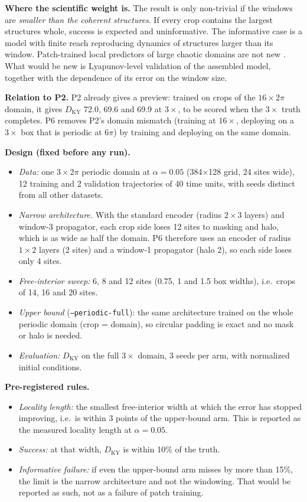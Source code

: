 \documentclass[11pt]{article}
\begin{document}
\textbf{Where the scientific weight is.} The result is only non-trivial
if the windows are \emph{smaller than the coherent structures}. If every
crop contains the largest structures whole, success is expected and
uninformative. The informative case is a model with finite reach
reproducing dynamics of structures larger than its window. Patch-trained
local predictors of large chaotic domains are not new
\cite{pathak2018}. What would be new is Lyapunov-level validation of the
assembled model, together with the dependence of its error on the window
size.

\textbf{Relation to P2.} P2 already gives a preview: trained on crops of
the $16\times2\pi$ domain, it gives $D_{\mathrm{KY}}$ 72.0, 69.6 and 69.9
at $3\times$, to be scored when the $3\times$ truth completes. P6
removes P2's domain mismatch (training at $16\times$, deploying on a
$3\times$ box that is periodic at $6\pi$) by training and deploying on
the same domain.

\textbf{Design (fixed before any run).}
\begin{itemize}[leftmargin=*]
\item \emph{Data:} one $3\times2\pi$ periodic domain at $\alpha{=}0.05$
  (384$\times$128 grid, 24 sites wide), 12 training and 2 validation
  trajectories of 40 time units, with seeds distinct from all other
  datasets.
\item \emph{Narrow architecture.} With the standard encoder (radius
  $2\times3$ layers) and window-3 propagator, each crop side loses 12
  sites to masking and halo, which is as wide as half the domain. P6
  therefore uses an encoder of radius $1\times2$ layers (2 sites) and a
  window-1 propagator (halo 2), so each side loses only 4 sites.
\item \emph{Free-interior sweep:} 6, 8 and 12 sites (0.75, 1 and 1.5
  box widths), i.e.\ crops of 14, 16 and 20 sites.
\item \emph{Upper bound} (\texttt{--periodic-full}): the same
  architecture trained on the whole periodic domain (crop = domain), so
  circular padding is exact and no mask or halo is needed.
\item \emph{Evaluation:} $D_{\mathrm{KY}}$ on the full $3\times$ domain,
  3 seeds per arm, with normalized initial conditions.
\end{itemize}

\textbf{Pre-registered rules.}
\begin{itemize}[leftmargin=*]
\item \emph{Locality length:} the smallest free-interior width at which
  the error has stopped improving, i.e.\ is within 3 points of the
  upper-bound arm. This is reported as the measured locality length at
  $\alpha{=}0.05$.
\item \emph{Success:} at that width, $D_{\mathrm{KY}}$ is within 10\% of
  the truth.
\item \emph{Informative failure:} if even the upper-bound arm misses by
  more than 15\%, the limit is the narrow architecture and not the
  windowing. That would be reported as such, not as a failure of patch
  training.
\end{itemize}
\end{document}
